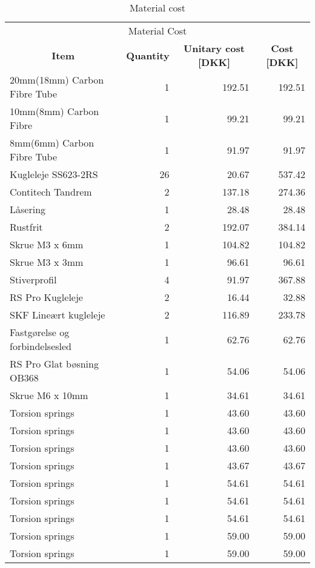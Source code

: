 \begin{table}[htbp]
\caption{Material cost}
\begin{tabular}{l|r|r|r}

\multicolumn{4}{c}{\Large Material Cost} \\
\multicolumn{1}{c|}{\textbf{Item}} & \multicolumn{1}{c|}{\textbf{Quantity}} & \multicolumn{1}{c|}{\textbf{Unitary cost [DKK]}} & \multicolumn{1}{c}{\textbf{Cost [DKK]}} \\ \hline
20mm(18mm) Carbon Fibre Tube & 1 & 192.51 & 192.51 \\ \hline
10mm(8mm) Carbon Fibre & 1 & 99.21 & 99.21 \\ \hline
8mm(6mm) Carbon Fibre Tube & 1 & 91.97 & 91.97 \\ \hline
Kugleleje SS623-2RS & 26 & 20.67 & 537.42 \\ \hline
Contitech Tandrem & 2 & 137.18 & 274.36 \\ \hline
Låsering & 1 & 28.48 & 28.48 \\ \hline
Rustfrit & 2 & 192.07 & 384.14 \\ \hline
Skrue M3 x 6mm & 1 & 104.82 & 104.82 \\ \hline
Skrue M3 x 3mm & 1 & 96.61 & 96.61 \\ \hline
Stiverprofil & 4 & 91.97 & 367.88 \\ \hline
RS Pro Kugleleje & 2 & 16.44 & 32.88 \\ \hline
SKF Lineært kugleleje & 2 & 116.89 & 233.78 \\ \hline
Fastgørelse og forbindelsesled & 1 & 62.76 & 62.76 \\ \hline
RS Pro Glat bøsning OB368 & 1 & 54.06 & 54.06 \\ \hline
Skrue M6 x 10mm & 1 & 34.61 & 34.61 \\ \hline
Torsion springs & 1 & 43.60 & 43.60 \\ \hline
Torsion springs & 1 & 43.60 & 43.60 \\ \hline
Torsion springs & 1 & 43.60 & 43.60 \\ \hline
Torsion springs & 1 & 43.67 & 43.67 \\ \hline
Torsion springs & 1 & 54.61 & 54.61 \\ \hline
Torsion springs & 1 & 54.61 & 54.61 \\ \hline
Torsion springs & 1 & 54.61 & 54.61 \\ \hline
Torsion springs & 1 & 59.00 & 59.00 \\ \hline
Torsion springs & 1 & 59.00 & 59.00 \\ \hline

\end{tabular}
\end{table}
